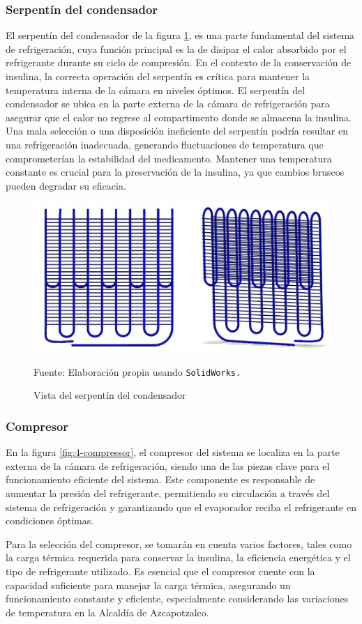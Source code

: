  \subsubsection{Serpentín del condensador}
 El serpentín del condensador de la figura  \ref{fig:4condenser}, es una parte fundamental del sistema de refrigeración, cuya función principal es la de disipar el calor absorbido por el refrigerante durante su ciclo de compresión. En el contexto de la conservación de insulina, la correcta operación del serpentín es crítica para mantener la temperatura interna de la cámara en niveles óptimos. El serpentín del condensador se ubica en la parte externa de la cámara de refrigeración para asegurar que el calor no regrese al compartimento donde se almacena la insulina.\\
 Una mala selección o una disposición ineficiente del serpentín podría resultar en una refrigeración inadecuada, generando fluctuaciones de temperatura que comprometerían la estabilidad del medicamento. Mantener una temperatura constante es crucial para la preservación de la insulina, ya que cambios bruscos pueden degradar su eficacia.
 \begin{figure}[H]
 	\centering
 	\includegraphics[width=0.6\linewidth]{figures/4condenser}
 	\caption{Vista del serpentín del condensador}
 	Fuente: Elaboración propia usando \texttt{SolidWorks.}
 	\label{fig:4condenser}
 \end{figure}
 
 
 \subsubsection{Compresor}
 En la figura \ref{fig:4-compressor}, el compresor del sistema se localiza en la parte externa de la cámara de refrigeración, siendo una de las piezas clave para el funcionamiento eficiente del sistema. Este componente es responsable de aumentar la presión del refrigerante, permitiendo su circulación a través del sistema de refrigeración y garantizando que el evaporador reciba el refrigerante en condiciones óptimas. \
 
 Para la selección del compresor, se tomarán en cuenta varios factores, tales como la carga térmica requerida para conservar la insulina, la eficiencia energética y el tipo de refrigerante utilizado. Es esencial que el compresor cuente con la capacidad suficiente para manejar la carga térmica, asegurando un funcionamiento constante y eficiente, especialmente considerando las variaciones de temperatura en la Alcaldía de Azcapotzalco. \
 

